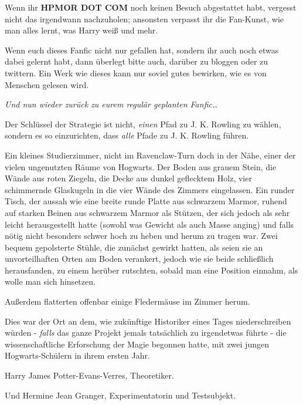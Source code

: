 {Wenn ihr \textbf{HPMOR DOT COM} noch keinen Besuch abgestattet habt, vergesst nicht das irgendwann nachzuholen; ansonsten verpasst ihr die Fan-Kunst, wie man alles lernt, was Harry weiß und mehr.

Wenn euch dieses Fanfic nicht nur gefallen hat, sondern ihr auch noch etwas dabei gelernt habt, dann überlegt bitte auch, darüber zu bloggen oder zu twittern. Ein Werk wie dieses kann nur soviel gutes bewirken, wie es von Menschen gelesen wird.

\emph{Und nun wieder zurück zu eurem regulär geplanten Fanfic…}

\later

Der Schlüssel der Strategie ist nicht, \emph{einen} Pfad zu J. K. Rowling zu wählen, sondern es so einzurichten, dass \emph{alle} Pfade zu J. K. Rowling führen.

\later

Ein kleines Studierzimmer, nicht im Ravenclaw-Turn doch in der Nähe, einer der vielen ungenutzten Räume von Hogwarts. Der Boden aus grauem Stein, die Wände aus roten Ziegeln, die Decke aus dunkel geflecktem Holz, vier schimmernde Glaskugeln in die vier Wände des Zimmers eingelassen. Ein runder Tisch, der aussah wie eine breite runde Platte aus schwarzem Marmor, ruhend auf starken Beinen aus schwarzem Marmor als Stützen, der sich jedoch als sehr leicht herausgestellt hatte (sowohl was Gewicht als auch Masse anging) und falls nötig nicht besonders schwer hoch zu heben und herum zu tragen war. Zwei bequem gepolsterte Stühle, die zunächst gewirkt hatten, als seien sie an unvorteilhaften Orten am Boden verankert, jedoch wie sie beide schließlich herausfanden, zu einem herüber rutschten, sobald man eine Position einnahm, als wolle man sich hinsetzen.

Außerdem flatterten offenbar einige Fledermäuse im Zimmer herum.

Dies war der Ort an dem, wie zukünftige Historiker eines Tages niederschreiben würden - \emph{falls} das ganze Projekt jemals tatsächlich zu irgendetwas führte - die wissenschaftliche Erforschung der Magie begonnen hatte, mit zwei jungen Hogwarts-Schülern in ihrem ersten Jahr.

Harry James Potter-Evans-Verres, Theoretiker.

Und Hermine Jean Granger, Experimentatorin und Testsubjekt.

}
